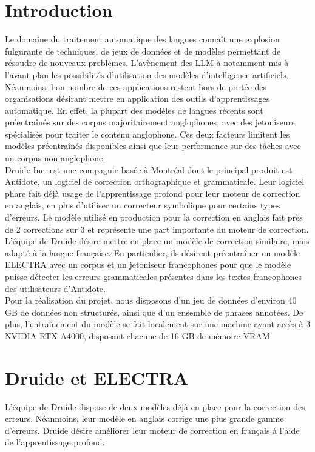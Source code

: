 \documentclass[12pt,twoside,rapport]{dms}
\theoremstyle{definition}
\numberwithin{equation}{section}
\numberwithin{table}{chapter}
\numberwithin{figure}{chapter}
\begin{document}
\setcounter{page}{17} %
\chapter*{Introduction}
Le domaine du traitement automatique des langues connaît une explosion
fulgurante de techniques, de jeux de données et de modèles permettant de
résoudre de nouveaux problèmes. L'avènement des LLM à notamment mis à
l'avant-plan les possibilités d'utilisation des modèles d'intelligence
artificiels. Néanmoins, bon nombre de ces applications restent hors de portée
des organisations désirant mettre en application des outils d'apprentissages
automatique. En effet, la plupart des modèles de langues récents sont
préentraînés sur des corpus majoritairement anglophones, avec des jetoniseurs
spécialisés pour traiter le contenu anglophone. Ces deux
facteurs limitent les modèles préentraînés disponibles ainsi que leur
performance sur des tâches avec un corpus non anglophone.\\

Druide Inc. est une compagnie basée à Montréal dont le principal produit est
Antidote, un logiciel de correction orthographique et grammaticale. Leur
logiciel phare fait déjà usage de l'apprentissage profond pour leur moteur de
correction en anglais, en plus d'utiliser un correcteur symbolique pour
certains types d'erreurs. Le modèle utilisé en production pour la correction en
anglais fait près de 2 corrections sur 3 et représente une part importante du
moteur de correction. L'équipe de Druide désire mettre en place un modèle de
correction similaire, mais adapté à la langue française. En particulier, ils
désirent préentraîner un modèle ELECTRA avec un corpus et un jetoniseur
francophones pour que le modèle puisse détecter les erreurs grammaticales
présentes dans les textes francophones des utilisateurs d'Antidote.\\

Pour la réalisation du projet, nous disposons d'un jeu de données d'environ 40
GB de données non structurés, ainsi que d'un ensemble de phrases annotées. De
plus, l'entraînement du modèle se fait localement sur une machine ayant accès à
3 NVIDIA RTX A4000, disposant chacune de 16 GB de mémoire VRAM.



\chapter{Druide et ELECTRA}
L'équipe de Druide dispose de deux modèles déjà en place pour la correction des
erreurs. Néanmoins, leur modèle en anglais corrige une plus grande gamme
d'erreurs. Druide désire améliorer leur moteur de correction en français à
l'aide de l'apprentissage profond.
\end{document}
